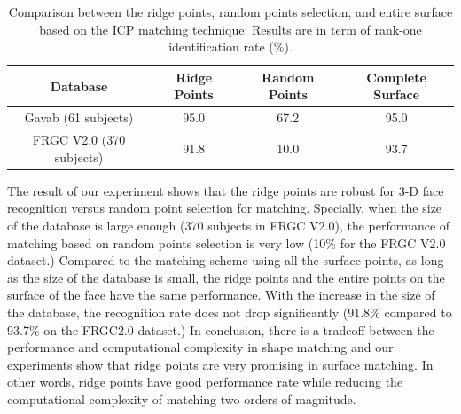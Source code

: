 \begin{table}
\begin{center}
\begin{tabular}{|c|c|c|c|}
 \hline
 Database&Ridge Points&Random Points&Complete Surface\\
\hline \hline
Gavab (61 subjects)&95.0&67.2& 95.0\\
FRGC V2.0 (370 subjects)&91.8&10.0&93.7\\
\hline
\end{tabular} \caption{Comparison between the ridge points, random points selection, and entire surface
based on the ICP matching technique; Results are in term of rank-one
identification rate (\%).}\label{tab_random_points}
\end{center}
\end{table}

The result of our experiment shows that the ridge points are robust
for 3-D face recognition versus random point selection for matching.
Specially, when the size of the database is large enough (370
subjects in FRGC V2.0), the performance of matching based on random
points selection is very low (10\% for the FRGC V2.0 dataset.)
Compared to the matching scheme using all the surface points, as
long as the size of the database is small, the ridge points and the
entire points on the surface of the face have the same performance.
With the increase in the size of the database, the recognition rate
does not drop significantly (91.8\% compared to 93.7\% on the
FRGC2.0 dataset.) In conclusion, there is a tradeoff between the
performance and computational complexity in shape matching and our
experiments show that ridge points are very promising in surface
matching. In other words, ridge points have good performance rate
while reducing the computational complexity of matching two orders
of magnitude.

